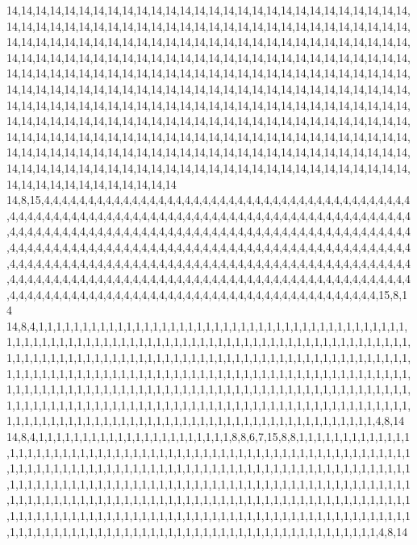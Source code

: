 14,14,14,14,14,14,14,14,14,14,14,14,14,14,14,14,14,14,14,14,14,14,14,14,14,14,14,14,14,14,14,14,14,14,14,14,14,14,14,14,14,14,14,14,14,14,14,14,14,14,14,14,14,14,14,14,14,14,14,14,14,14,14,14,14,14,14,14,14,14,14,14,14,14,14,14,14,14,14,14,14,14,14,14,14,14,14,14,14,14,14,14,14,14,14,14,14,14,14,14,14,14,14,14,14,14,14,14,14,14,14,14,14,14,14,14,14,14,14,14,14,14,14,14,14,14,14,14,14,14,14,14,14,14,14,14,14,14,14,14,14,14,14,14,14,14,14,14,14,14,14,14,14,14,14,14,14,14,14,14,14,14,14,14,14,14,14,14,14,14,14,14,14,14,14,14,14,14,14,14,14,14,14,14,14,14,14,14,14,14,14,14,14,14,14,14,14,14,14,14,14,14,14,14,14,14,14,14,14,14,14,14,14,14,14,14,14,14,14,14,14,14,14,14,14,14,14,14,14,14,14,14,14,14,14,14,14,14,14,14,14,14,14,14,14,14,14,14,14,14,14,14,14,14,14,14,14,14,14,14,14,14,14,14,14,14,14,14,14,14,14,14,14,14,14,14,14,14,14,14,14,14,14,14,14,14,14,14,14,14,14,14,14,14,14,14,14,14,14,14,14,14,14,14,14,14,14,14,14,14,14,14,14,14,14,14,14,14,14,14
14,8,15,4,4,4,4,4,4,4,4,4,4,4,4,4,4,4,4,4,4,4,4,4,4,4,4,4,4,4,4,4,4,4,4,4,4,4,4,4,4,4,4,4,4,4,4,4,4,4,4,4,4,4,4,4,4,4,4,4,4,4,4,4,4,4,4,4,4,4,4,4,4,4,4,4,4,4,4,4,4,4,4,4,4,4,4,4,4,4,4,4,4,4,4,4,4,4,4,4,4,4,4,4,4,4,4,4,4,4,4,4,4,4,4,4,4,4,4,4,4,4,4,4,4,4,4,4,4,4,4,4,4,4,4,4,4,4,4,4,4,4,4,4,4,4,4,4,4,4,4,4,4,4,4,4,4,4,4,4,4,4,4,4,4,4,4,4,4,4,4,4,4,4,4,4,4,4,4,4,4,4,4,4,4,4,4,4,4,4,4,4,4,4,4,4,4,4,4,4,4,4,4,4,4,4,4,4,4,4,4,4,4,4,4,4,4,4,4,4,4,4,4,4,4,4,4,4,4,4,4,4,4,4,4,4,4,4,4,4,4,4,4,4,4,4,4,4,4,4,4,4,4,4,4,4,4,4,4,4,4,4,4,4,4,4,4,4,4,4,4,4,4,4,4,4,4,4,4,4,4,4,4,4,4,4,4,4,4,4,4,4,4,4,4,4,4,4,4,4,4,4,4,4,4,4,4,4,4,4,4,4,4,4,4,4,4,15,8,14
14,8,4,1,1,1,1,1,1,1,1,1,1,1,1,1,1,1,1,1,1,1,1,1,1,1,1,1,1,1,1,1,1,1,1,1,1,1,1,1,1,1,1,1,1,1,1,1,1,1,1,1,1,1,1,1,1,1,1,1,1,1,1,1,1,1,1,1,1,1,1,1,1,1,1,1,1,1,1,1,1,1,1,1,1,1,1,1,1,1,1,1,1,1,1,1,1,1,1,1,1,1,1,1,1,1,1,1,1,1,1,1,1,1,1,1,1,1,1,1,1,1,1,1,1,1,1,1,1,1,1,1,1,1,1,1,1,1,1,1,1,1,1,1,1,1,1,1,1,1,1,1,1,1,1,1,1,1,1,1,1,1,1,1,1,1,1,1,1,1,1,1,1,1,1,1,1,1,1,1,1,1,1,1,1,1,1,1,1,1,1,1,1,1,1,1,1,1,1,1,1,1,1,1,1,1,1,1,1,1,1,1,1,1,1,1,1,1,1,1,1,1,1,1,1,1,1,1,1,1,1,1,1,1,1,1,1,1,1,1,1,1,1,1,1,1,1,1,1,1,1,1,1,1,1,1,1,1,1,1,1,1,1,1,1,1,1,1,1,1,1,1,1,1,1,1,1,1,1,1,1,1,1,1,1,1,1,1,1,1,1,1,1,1,1,1,1,1,1,1,1,1,1,1,1,1,1,1,1,1,1,1,1,1,1,1,1,4,8,14
14,8,4,1,1,1,1,1,1,1,1,1,1,1,1,1,1,1,1,1,1,1,1,1,1,8,8,6,7,15,8,8,1,1,1,1,1,1,1,1,1,1,1,1,1,1,1,1,1,1,1,1,1,1,1,1,1,1,1,1,1,1,1,1,1,1,1,1,1,1,1,1,1,1,1,1,1,1,1,1,1,1,1,1,1,1,1,1,1,1,1,1,1,1,1,1,1,1,1,1,1,1,1,1,1,1,1,1,1,1,1,1,1,1,1,1,1,1,1,1,1,1,1,1,1,1,1,1,1,1,1,1,1,1,1,1,1,1,1,1,1,1,1,1,1,1,1,1,1,1,1,1,1,1,1,1,1,1,1,1,1,1,1,1,1,1,1,1,1,1,1,1,1,1,1,1,1,1,1,1,1,1,1,1,1,1,1,1,1,1,1,1,1,1,1,1,1,1,1,1,1,1,1,1,1,1,1,1,1,1,1,1,1,1,1,1,1,1,1,1,1,1,1,1,1,1,1,1,1,1,1,1,1,1,1,1,1,1,1,1,1,1,1,1,1,1,1,1,1,1,1,1,1,1,1,1,1,1,1,1,1,1,1,1,1,1,1,1,1,1,1,1,1,1,1,1,1,1,1,1,1,1,1,1,1,1,1,1,1,1,1,1,1,1,1,1,1,1,1,1,1,1,1,1,1,1,1,1,1,1,1,1,1,1,1,1,1,4,8,14
